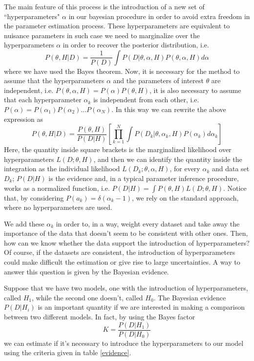 \documentclass[onecolumn,           %
               showpacs,            %
               preprintnumbers,     %
               aps,                 %
               letterpaper,             %
               superscriptaddress,      %
               nofootinbib,         %
               tightenlines,        %
               floats,floatfix      %
               ,usenatbib,
               ]{revtex4-1}
\begin{document}
The main feature of this process is the introduction of a new set of ``hyperparameters" $\alpha$ in our bayesian procedure in order to avoid extra freedom in the parameter estimation process.  These hyperparameters are equivalent to nuisance parameters in such case we need to marginalize over the hyperparameters $\alpha$ in order to recover the posterior distribution, i.e.
\begin{equation}
P(\theta,H|D)=\frac{1}{P(D)}\int P(D|\theta,\alpha,H)P(\theta,\alpha,H)d\alpha
\end{equation}
where we have used the Bayes theorem. Now, it is necessary for the method to assume that the hyperparameters $\alpha$ and the parameters of interest $\theta$ are independent, i.e. $P(\theta,\alpha,H)=P(\alpha)P(\theta,H)$, it is also necessary to assume that each hyperparameter $\alpha_k$ is independent from each other, i.e. $P(\alpha)=P(\alpha_1)P(\alpha_2)...P(\alpha_N)$. In this way we can rewrite the above expression as
\begin{equation}
P(\theta,H|D)=\frac{P(\theta,H)}{P(D|H)}\left[\prod_{k=1}^N\int P(D_k|\theta,\alpha_k,H)P(\alpha_k)d\alpha_k\right]
\end{equation}
Here, the quantity inside square brackets is the marginalized likelihood over hyperparameters $L(D;\theta,H)$, and then we can identify the quantity inside the integration as the individual likelihood $L(D_k;\theta,\alpha,H)$, for every $\alpha_k$ and data set $D_k$; $P(D|H)$ is the evidence and, in a typical parameter inference procedure, works as a normalized function, i.e. $P(D|H)=\int P(\theta,H)L(D;\theta,H)$. Notice that, by considering $P(a_k)=\delta(\alpha_k-1)$, we rely on the standard approach, where no hyperparameters are used.  

We add these $\alpha_k$ in order to, in a way, weight every dataset and take away the importance of the data that doesn't seem to be consistent with other ones. Then, how can we know whether the data support the introduction of hyperparameters? Of course, if the datasets are consistent, the introduction of hyperparameters could make difficult the estimation or give rise to large uncertainties. A way to answer this question is given by the Bayesian evidence.

Suppose that we have two models, one with the introduction of hyperparameters, called $H_1$, while the second one doesn't, called $H_0$. The Bayesian evidence $P(D|H_i)$ is an important quantity if we are interested in making a comparison between two different models. In fact, by using the Bayes factor
\begin{equation}
K=\frac{P(D|H_1)}{P(D|H_0)}
\end{equation}
we can estimate if it's necessary to introduce the hyperparameters to our model using the criteria given in table \ref{evidence}.
\end{document}
